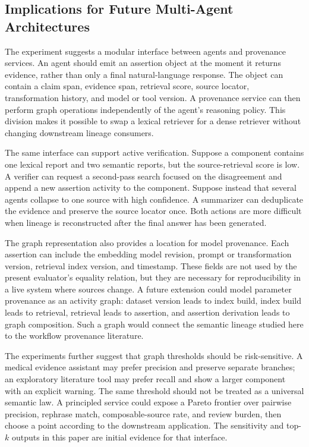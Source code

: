 \documentclass{ieeeaccess}
\begin{document}
\subsection{Implications for Future Multi-Agent Architectures}
The experiment suggests a modular interface between agents and provenance services. An agent should emit an assertion object at the moment it returns evidence, rather than only a final natural-language response. The object can contain a claim span, evidence span, retrieval score, source locator, transformation history, and model or tool version. A provenance service can then perform graph operations independently of the agent's reasoning policy. This division makes it possible to swap a lexical retriever for a dense retriever without changing downstream lineage consumers.

The same interface can support active verification. Suppose a component contains one lexical report and two semantic reports, but the source-retrieval score is low. A verifier can request a second-pass search focused on the disagreement and append a new assertion activity to the component. Suppose instead that several agents collapse to one source with high confidence. A summarizer can deduplicate the evidence and preserve the source locator once. Both actions are more difficult when lineage is reconstructed after the final answer has been generated.

The graph representation also provides a location for model provenance. Each assertion can include the embedding model revision, prompt or transformation version, retrieval index version, and timestamp. These fields are not used by the present evaluator's equality relation, but they are necessary for reproducibility in a live system where sources change. A future extension could model parameter provenance as an activity graph: dataset version leads to index build, index build leads to retrieval, retrieval leads to assertion, and assertion derivation leads to graph composition. Such a graph would connect the semantic lineage studied here to the workflow provenance literature.

The experiments further suggest that graph thresholds should be risk-sensitive. A medical evidence assistant may prefer precision and preserve separate branches; an exploratory literature tool may prefer recall and show a larger component with an explicit warning. The same threshold should not be treated as a universal semantic law. A principled service could expose a Pareto frontier over pairwise precision, rephrase match, composable-source rate, and review burden, then choose a point according to the downstream application. The sensitivity and top-$k$ outputs in this paper are initial evidence for that interface.
\end{document}
